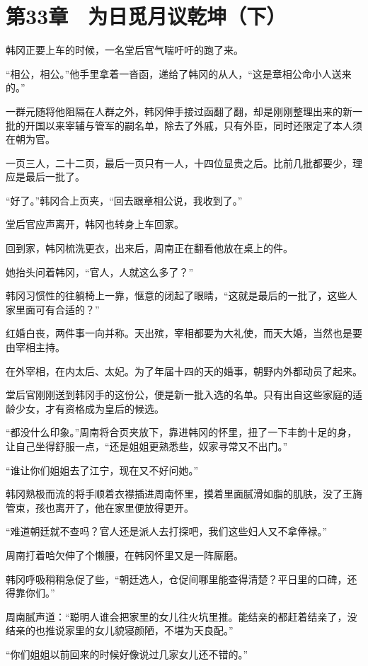\section{第33章　为日觅月议乾坤（下）}

韩冈正要上车的时候，一名堂后官气喘吁吁的跑了来。

“相公，相公。”他手里拿着一沓函，递给了韩冈的从人，“这是章相公命小人送来的。”

一群元随将他阻隔在人群之外，韩冈伸手接过函翻了翻，却是刚刚整理出来的新一批的开国以来宰辅与管军的嗣名单，除去了外戚，只有外臣，同时还限定了本人须在朝为官。

一页三人，二十二页，最后一页只有一人，十四位显贵之后。比前几批都要少，理应是最后一批了。

“好了。”韩冈合上页夹，“回去跟章相公说，我收到了。”

堂后官应声离开，韩冈也转身上车回家。

回到家，韩冈梳洗更衣，出来后，周南正在翻看他放在桌上的件。

她抬头问着韩冈，“官人，人就这么多了？”

韩冈习惯性的往躺椅上一靠，惬意的闭起了眼睛，“这就是最后的一批了，这些人家里面可有合适的？”

红婚白丧，两件事一向并称。天出殡，宰相都要为大礼使，而天大婚，当然也是要由宰相主持。

在外宰相，在内太后、太妃。为了年届十四的天的婚事，朝野内外都动员了起来。

堂后官刚刚送到韩冈手的这份公，便是新一批入选的名单。只有出自这些家庭的适龄少女，才有资格成为皇后的候选。

“都没什么印象。”周南将合页夹放下，靠进韩冈的怀里，扭了一下丰韵十足的身，让自己坐得舒服一点，“还是姐姐更熟悉些，奴家寻常又不出门。”

“谁让你们姐姐去了江宁，现在又不好问她。”

韩冈熟极而流的将手顺着衣襟插进周南怀里，摸着里面腻滑如脂的肌肤，没了王旖管束，孩也离开了，他在家里便放得更开。

“难道朝廷就不查吗？官人还是派人去打探吧，我们这些妇人又不拿俸禄。”

周南打着哈欠伸了个懒腰，在韩冈怀里又是一阵厮磨。

韩冈呼吸稍稍急促了些，“朝廷选人，仓促间哪里能查得清楚？平日里的口碑，还得靠你们。”

周南腻声道：“聪明人谁会把家里的女儿往火坑里推。能结亲的都赶着结亲了，没结亲的也推说家里的女儿貌寝颜陋，不堪为天良配。”

“你们姐姐以前回来的时候好像说过几家女儿还不错的。”

